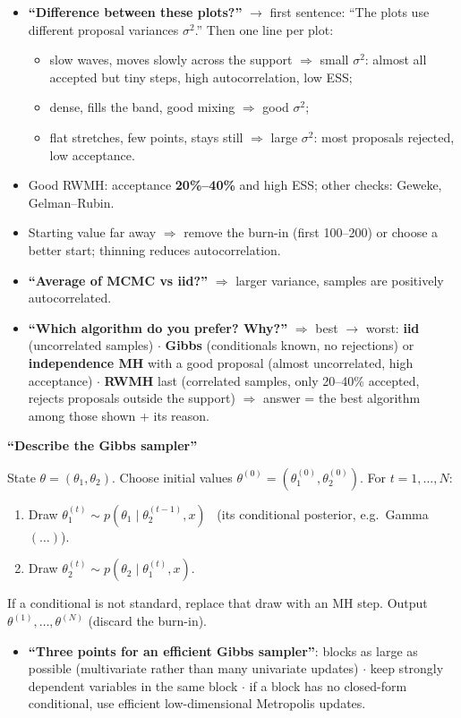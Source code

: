 \documentclass[10pt]{article}
\newcommand{\Q}[1]{\textbf{``#1''}}
\newcommand{\sub}[1]{\par\vspace{4pt}{\bfseries #1}\par\vspace{1pt}}
\newenvironment{answer}[1][Answer to write]{\par\vspace{2pt}\begin{shaded}\small\textbf{#1}\par\vspace{1pt}}{\end{shaded}\vspace{-2pt}}
\begin{document}
\sub{Performance: trace plot, acceptance rate, ESS}
\begin{itemize}
\item \Q{Difference between these plots?} $\to$ first sentence: ``The plots use different proposal variances $\sigma^2$.'' Then one line per plot:
  \begin{itemize}
  \item slow waves, moves slowly across the support $\Rightarrow$ small $\sigma^2$: almost all accepted but tiny steps, high autocorrelation, low ESS;
  \item dense, fills the band, good mixing $\Rightarrow$ good $\sigma^2$;
  \item flat stretches, few points, stays still $\Rightarrow$ large $\sigma^2$: most proposals rejected, low acceptance.
  \end{itemize}
\item Good RWMH: acceptance \textbf{20\%--40\%} and high ESS; other checks: Geweke, Gelman--Rubin.
\item Starting value far away $\Rightarrow$ remove the burn-in (first 100--200) or choose a better start; thinning reduces autocorrelation.
\item \Q{Average of MCMC vs iid?} $\Rightarrow$ larger variance, samples are positively autocorrelated.
\item \Q{Which algorithm do you prefer? Why?} $\Rightarrow$ best $\to$ worst: \textbf{iid} (uncorrelated samples) $\cdot$ \textbf{Gibbs} (conditionals known, no rejections) or \textbf{independence MH} with a good proposal (almost uncorrelated, high acceptance) $\cdot$ \textbf{RWMH} last (correlated samples, only 20--40\% accepted, rejects proposals outside the support) $\Rightarrow$ answer = the best algorithm among those shown + its reason.
\end{itemize}

\begin{answer}[\Q{Describe the Gibbs sampler}]
State $\theta=(\theta_1,\theta_2)$. Choose initial values $\theta^{(0)}=(\theta_1^{(0)},\theta_2^{(0)})$. For $t=1,\dots,N$:
\begin{enumerate}
\item Draw $\theta_1^{(t)}\sim p(\theta_1\mid\theta_2^{(t-1)},x)$ \ (its conditional posterior, e.g.\ Gamma$(\dots)$).
\item Draw $\theta_2^{(t)}\sim p(\theta_2\mid\theta_1^{(t)},x)$.
\end{enumerate}
If a conditional is not standard, replace that draw with an MH step. Output $\theta^{(1)},\dots,\theta^{(N)}$ (discard the burn-in).
\end{answer}
\begin{itemize}
\item \Q{Three points for an efficient Gibbs sampler}: blocks as large as possible (multivariate rather than many univariate updates) $\cdot$ keep strongly dependent variables in the same block $\cdot$ if a block has no closed-form conditional, use efficient low-dimensional Metropolis updates.
\end{itemize}
\end{document}
